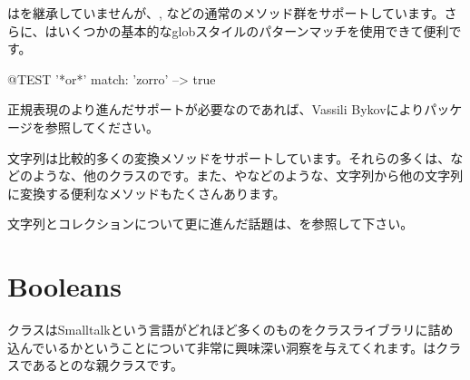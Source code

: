 \documentclass[a4paper,10pt,twoside]{book}
\begin{document}
はを継承していませんが、\ct{<}, \ct{=}などの通常のメソッド群をサポートしています。さらに、はいくつかの基本的なglobスタイルのパターンマッチを使用できて便利です。

\begin{code}{@TEST}
'*or*' match: 'zorro' --> true
\end{code}

正規表現のより進んだサポートが必要なのであれば、Vassili Bykovによりパッケージを参照してください。

文字列は比較的多くの変換メソッドをサポートしています。それらの多くは、などのような、他のクラスのです。また、やなどのような、文字列から他の文字列に変換する便利なメソッドもたくさんあります。

文字列とコレクションについて更に進んだ話題は、を参照して下さい。


\section{Booleans}

クラスはSmalltalkという言語がどれほど多くのものをクラスライブラリに詰め込んでいるかということについて非常に興味深い洞察を与えてくれます。はクラスであるとのな親クラスです。
\end{document}
